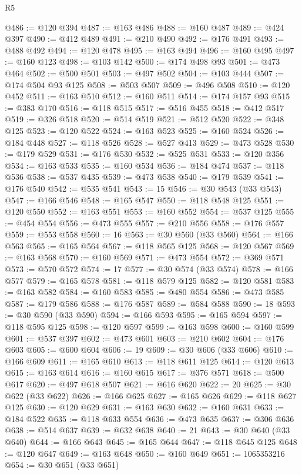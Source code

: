 \begin{lexlean}{R5}
\begin{coremodule}
@486 := @120 @394
@487 := @163 @486
@488 := @160 @487
@489 := @424 @397
@490 := @412 @489
@491 := @210 @490
@492 := @176 @491
@493 := @488 @492
@494 := @120 @478
@495 := @163 @494
@496 := @160 @495
@497 := @160 @123
@498 := @103 @142
@500 := @174 @498 @93
@501 := @473 @464
@502 := @500 @501
@503 := @497 @502
@504 := @103 @444
@507 := @174 @504 @93 @125
@508 := @503 @507
@509 := @496 @508
@510 := @120 @452
@511 := @163 @510
@512 := @160 @511
@514 := @174 @157 @93
@515 := @383 @170
@516 := @118 @515
@517 := @516 @455
@518 := @412 @517
@519 := @326 @518
@520 := @514 @519
@521 := @512 @520
@522 := @348 @125
@523 := @120 @522
@524 := @163 @523
@525 := @160 @524
@526 := @184 @448
@527 := @118 @526
@528 := @527 @413
@529 := @473 @528
@530 := @179 @529
@531 := @176 @530
@532 := @525 @531
@533 := @120 @356
@534 := @163 @533
@535 := @160 @534
@536 := @184 @474
@537 := @118 @536
@538 := @537 @435
@539 := @473 @538
@540 := @179 @539
@541 := @176 @540
@542 := @535 @541
@543 := 15
@546 := @30 @543 (@33 @543)
@547 := @166 @546
@548 := @165 @547
@550 := @118 @548 @125
@551 := @120 @550
@552 := @163 @551
@553 := @160 @552
@554 := @537 @125
@555 := @454 @554
@556 := @473 @555
@557 := @210 @556
@558 := @176 @557
@559 := @553 @558
@560 := 16
@563 := @30 @560 (@33 @560)
@564 := @166 @563
@565 := @165 @564
@567 := @118 @565 @125
@568 := @120 @567
@569 := @163 @568
@570 := @160 @569
@571 := @473 @554
@572 := @369 @571
@573 := @570 @572
@574 := 17
@577 := @30 @574 (@33 @574)
@578 := @166 @577
@579 := @165 @578
@581 := @118 @579 @125
@582 := @120 @581
@583 := @163 @582
@584 := @160 @583
@585 := @480 @554
@586 := @473 @585
@587 := @179 @586
@588 := @176 @587
@589 := @584 @588
@590 := 18
@593 := @30 @590 (@33 @590)
@594 := @166 @593
@595 := @165 @594
@597 := @118 @595 @125
@598 := @120 @597
@599 := @163 @598
@600 := @160 @599
@601 := @537 @397
@602 := @473 @601
@603 := @210 @602
@604 := @176 @603
@605 := @600 @604
@606 := 19
@609 := @30 @606 (@33 @606)
@610 := @166 @609
@611 := @165 @610
@613 := @118 @611 @125
@614 := @120 @613
@615 := @163 @614
@616 := @160 @615
@617 := @376 @571
@618 := @500 @617
@620 := @497 @618 @507
@621 := @616 @620
@622 := 20
@625 := @30 @622 (@33 @622)
@626 := @166 @625
@627 := @165 @626
@629 := @118 @627 @125
@630 := @120 @629
@631 := @163 @630
@632 := @160 @631
@633 := @184 @522
@635 := @118 @633 @554
@636 := @473 @635
@637 := @306 @636
@638 := @514 @637
@639 := @632 @638
@640 := 21
@643 := @30 @640 (@33 @640)
@644 := @166 @643
@645 := @165 @644
@647 := @118 @645 @125
@648 := @120 @647
@649 := @163 @648
@650 := @160 @649
@651 := 1065353216
@654 := @30 @651 (@33 @651)

\end{coremodule}
\end{lexlean}
